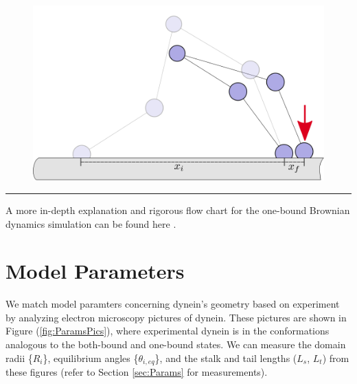 \begin{figure}[H]
\centering
\includegraphics[width=0.7\columnwidth]{Figures/montecarlo6.png}
\label{fig:mc4}
\end{figure}

\noindent\rule{16.5cm}{0.4pt}

A more in-depth explanation and rigorous flow chart for the one-bound Brownian dynamics simulation can be found here \cite{Capek2017, }.



\section{Model Parameters}

We match model paramters concerning dynein's geometry based on experiment by analyzing electron microscopy pictures of dynein. These pictures are shown in Figure (\ref{fig:ParamsPics}), where experimental dynein is in the conformations analogous to the both-bound and one-bound states. We can measure the domain radii \{$R_i$\}, equilibrium angles \{$\theta_{i,eq}$\}, and the stalk and tail lengths ($L_s$, $L_t$) from these figures (refer to Section \ref{sec:Params} for measurements).  

